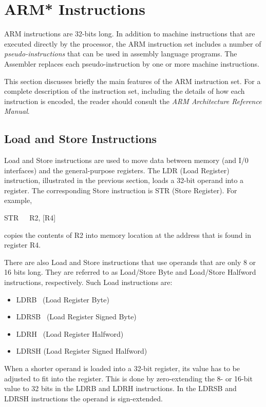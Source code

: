 \documentclass[11pt, twoside, pdftex]{article}
\begin{document}
\section{ARM* Instructions}

ARM instructions are 32-bits long. In addition to machine instructions that are executed directly by the processor, 
the ARM instruction set includes a number of
{\it pseudo-instructions} that can be used in assembly language
programs. The Assembler replaces each pseudo-instruction by one 
or more machine instructions.

This section discusses briefly the main features of the ARM instruction set. For a complete description of the instruction
set, including the details of how each instruction is encoded,
the reader should consult the 
{\it ARM Architecture Reference Manual}.

\subsection{Load and Store Instructions}

Load and Store instructions are used to move data between memory
(and I/0 interfaces) and the general-purpose registers. 
The LDR (Load Register) instruction, illustrated in the previous
section, loads a 32-bit operand into a register. 
The corresponding Store instruction is STR (Store Register). 
For example,
\begin{center}
STR~~~R2, [R4]
\end{center}
\noindent
copies the contents of R2 into memory location at the address
that is found in register R4.

There are also Load and Store instructions that use operands that are only 8 or 16 bits long.
They are referred to as Load/Store Byte and Load/Store Halfword instructions, respectively.
Such Load instructions are: 
\begin{itemize}
\item LDRB~ (Load Register Byte)
\item LDRSB~ (Load Register Signed Byte)
\item LDRH~ (Load Register Halfword)
\item LDRSH (Load Register Signed Halfword)
\end{itemize}
\noindent
When a shorter operand is loaded into a 32-bit register, its value has to be adjusted to fit into the register. This is done by zero-extending the 8- or 16-bit value to 32 bits
in the LDRB and LDRH instructions. In the LDRSB and LDRSH
instructions the operand is sign-extended.
 
\end{document}
